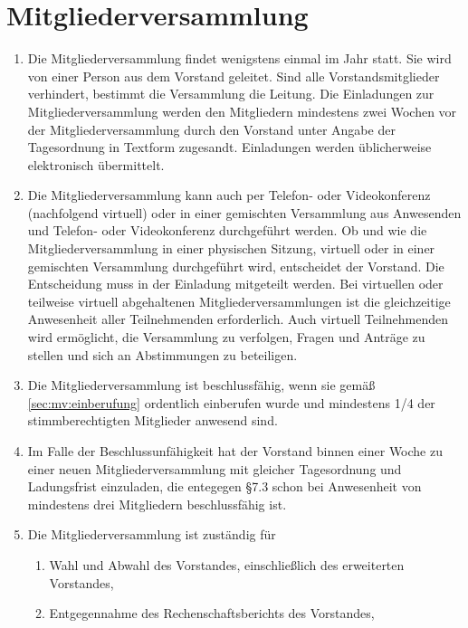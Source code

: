 \documentclass[12pt,paper=a4,ngerman]{scrreprt}
\begin{document}
	\section{Mitgliederversammlung}
	\begin{enumerate}
	    \item
	        \label{sec:mv:einberufung}
	        Die Mitgliederversammlung findet wenigstens einmal im Jahr statt. Sie wird von einer Person aus dem Vorstand geleitet. Sind alle Vorstandsmitglieder verhindert, bestimmt die Versammlung die Leitung. Die Einladungen zur Mitgliederversammlung werden den Mitgliedern mindestens zwei Wochen vor der Mitgliederversammlung durch den Vorstand unter Angabe der Tagesordnung in Textform zugesandt. Einladungen werden üblicherweise elektronisch übermittelt.
        \item
			Die Mitgliederversammlung kann auch per Telefon- oder Videokonferenz (nachfolgend \glqq{}virtuell\grqq{}) oder in einer gemischten Versammlung aus Anwesenden und Telefon- oder Videokonferenz durchgeführt werden. Ob und wie die Mitgliederversammlung in einer physischen Sitzung, virtuell oder in einer gemischten Versammlung durchgeführt wird, entscheidet der Vorstand. Die Entscheidung muss in der Einladung mitgeteilt werden.
			Bei virtuellen oder teilweise virtuell abgehaltenen Mitgliederversammlungen ist die gleichzeitige Anwesenheit aller Teilnehmenden erforderlich. Auch virtuell Teilnehmenden wird ermöglicht, die Versammlung zu verfolgen, Fragen und Anträge zu stellen und sich an Abstimmungen zu beteiligen.
        \item
            Die Mitgliederversammlung ist beschlussfähig, wenn sie gemäß \ref{sec:mv:einberufung} ordentlich einberufen wurde und mindestens 1/4 der stimmberechtigten Mitglieder anwesend sind.
        \item
            Im Falle der Beschlussunfähigkeit hat der Vorstand binnen einer Woche zu einer neuen Mitgliederversammlung mit gleicher Tagesordnung und Ladungsfrist einzuladen, die entegegen §7.3 schon bei Anwesenheit von mindestens drei Mitgliedern beschlussfähig ist.
        \item
            Die Mitgliederversammlung ist zuständig für
            \begin{enumerate}
                \item
                    Wahl und Abwahl des Vorstandes, einschließlich des erweiterten Vorstandes,
                \item
                    Entgegennahme des Rechenschaftsberichts des Vorstandes,

\end{enumerate}
\end{enumerate}
\end{document}
